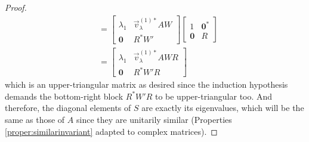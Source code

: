 \begin{proof}
\begin{align*}
&=
\left[\begin{array}{cc}
\lambda_1 & \vec{v}_\lambda^{(1)*}AW \\
\textbf{0} & R^*W'
\end{array}\right]
\left[\begin{array}{cc}
1 & \textbf{0}^* \\
\textbf{0} & R
\end{array}\right] \\
&=
\left[\begin{array}{cc}
\lambda_1 & \vec{v}_\lambda^{(1)*}AWR \\
\textbf{0} & R^*W'R
\end{array}\right]
\end{align*}
which is an upper-triangular matrix as desired since the induction hypothesis demands the bottom-right block $R^*W'R$ to be upper-triangular too. And therefore, the diagonal elements of $S$ are exactly its eigenvalues, which will be the same as those of $A$ since they are unitarily similar (Properties \ref{proper:similarinvariant} adapted to complex matrices). 
\end{proof}

